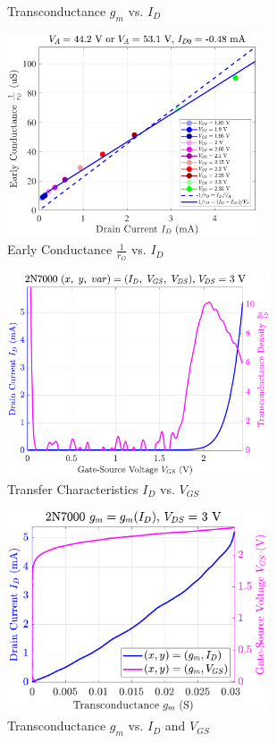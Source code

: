 \documentclass[UTF8]{article}
\begin{document}
\begin{center}
\begin{minipage}{0.45\columnwidth}
\begin{figure}[H]
            \caption{Transconductance $g_m$ vs. $I_D$}
        \end{figure}
    \end{minipage}\hfill\begin{minipage}{0.45\columnwidth}
        \begin{figure}[H]\centering
            \includegraphics[height=170pt]{LCE-04-场效应管/assets/2N7000/2N7000 (NMOS) [onsemi, KH32] current level low (0~5mA)/2025-04-24_00-33-56__stc_rO_Id_Vgs.pdf}
            \caption{Early Conductance $\frac{1}{r_O}$ vs. $I_D$}
        \end{figure}
        \begin{figure}[H]\centering
            \includegraphics[height=170pt]{LCE-04-场效应管/assets/2N7000/2N7000 (NMOS) [onsemi, KH32] current level low (0~5mA)/2025-04-24_00-34-00__stc_Id_Vgs_Vds.pdf}
            \caption{Transfer Characteristics $I_D$ vs. $V_{GS}$}
        \end{figure}
        \begin{figure}[H]\centering
            \includegraphics[height=170pt]{LCE-04-场效应管/assets/2N7000/2N7000 (NMOS) [onsemi, KH32] current level low (0~5mA)/2025-04-24_00-34-17__stc_gm_IdVgs_yyplot.pdf}
            \caption{Transconductance $g_m$ vs. $I_D$ and $V_{GS}$}
    \end{figure}
\end{minipage}\end{center}
\end{document}

